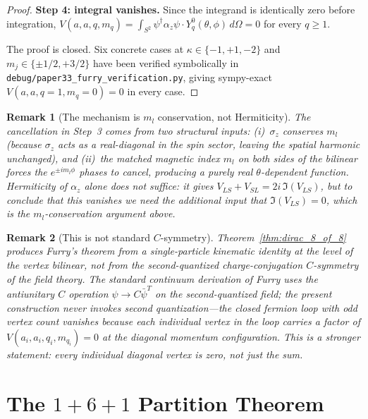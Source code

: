 \documentclass[11pt]{article}
\newtheorem{remark}{Remark}
\begin{document}
\begin{proof}
\textbf{Step 4: integral vanishes.}  Since the integrand is identically
zero before integration, $V(a, a, q, m_q) = \int_{S^2} \psi^{\dagger}
\alpha_z \psi \cdot Y_q^0(\theta, \phi)\, d\Omega = 0$ for every
$q \ge 1$.

The proof is closed.  Six concrete cases at $\kappa \in
\{-1, +1, -2\}$ and $m_j \in \{\pm 1/2, +3/2\}$ have been verified
symbolically in \texttt{debug/paper33\_furry\_verification.py},
giving sympy-exact $V(a, a, q = 1, m_q = 0) = 0$ in every case.
\end{proof}

\begin{remark}[The mechanism is $m_l$ conservation, not Hermiticity]
\label{rem:mechanism}
The cancellation in Step~3 comes from \emph{two} structural inputs:
(i)~$\sigma_z$ conserves $m_l$ (because $\sigma_z$ acts as a
real-diagonal in the spin sector, leaving the spatial harmonic
unchanged), and (ii)~the matched magnetic index $m_l$ on both sides
of the bilinear forces the $e^{\pm i m_l \phi}$ phases to cancel,
producing a purely real $\theta$-dependent function.  Hermiticity of
$\alpha_z$ alone does not suffice: it gives $V_{LS} + V_{SL}
= 2i\,\Im(V_{LS})$, but to conclude that this vanishes we need the
\emph{additional} input that $\Im(V_{LS}) = 0$, which is the
$m_l$-conservation argument above.
\end{remark}

\begin{remark}[This is not standard $C$-symmetry]
\label{rem:not_C}
Theorem~\ref{thm:dirac_8_of_8} produces Furry's theorem from a
\emph{single-particle} kinematic identity at the level of the vertex
bilinear, not from the second-quantized charge-conjugation
$C$-symmetry of the field theory.  The standard continuum derivation
of Furry uses the antiunitary $C$ operation $\psi \to C \bar{\psi}^T$
on the second-quantized field; the present construction never invokes
second quantization---the closed fermion loop with odd vertex count
vanishes because each individual vertex in the loop carries a factor
of $V(a_i, a_i, q_i, m_{q_i}) = 0$ at the diagonal momentum
configuration.  This is a stronger statement: every individual
diagonal vertex is zero, not just the sum.
\end{remark}

\section{The $1{+}6{+}1$ Partition Theorem}
\label{sec:partition}
\end{document}
